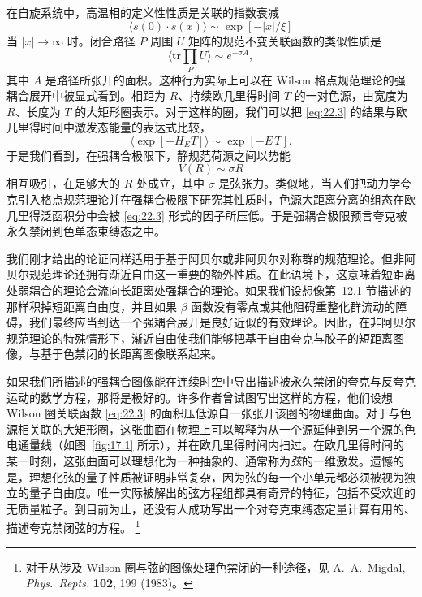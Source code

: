 在自旋系统中，高温相的定义性性质是关联的指数衰减
\begin{equation}
  \langle s(0)\cdot s(x)\rangle \sim \exp[-|x|/\xi]
  \label{eq:22.2}
\end{equation}
当 $|x|\to\infty$ 时。闭合路径 $P$ 周围 $U$ 矩阵的规范不变关联函数的类似性质是
\begin{equation}
  \bigl\langle \mathrm{tr}\prod_P U \bigr\rangle \sim e^{-\sigma A},
  \label{eq:22.3}
\end{equation}
其中 $A$ 是路径所张开的面积。这种行为实际上可以在 Wilson 格点规范理论的强耦合展开中被显式看到。相距为 $R$、持续欧几里得时间 $T$ 的一对色源，由宽度为 $R$、长度为 $T$ 的大矩形圈表示。对于这样的圈，我们可以把 \eqref{eq:22.3} 的结果与欧几里得时间中激发态能量的表达式比较，
\begin{equation}
  \langle \exp[-H_E T] \rangle \sim \exp[-E\,T] .
  \label{eq:22.4}
\end{equation}
于是我们看到，在强耦合极限下，静规范荷源之间以势能
\begin{equation}
  V(R) \sim \sigma R
  \label{eq:22.5}
\end{equation}
相互吸引，在足够大的 $R$ 处成立，其中 $\sigma$ 是弦张力。类似地，当人们把动力学夸克引入格点规范理论并在强耦合极限下研究其性质时，色源大距离分离的组态在欧几里得泛函积分中会被 \eqref{eq:22.3} 形式的因子所压低。于是强耦合极限预言夸克被永久禁闭到色单态束缚态之中。

我们刚才给出的论证同样适用于基于阿贝尔或非阿贝尔对称群的规范理论。但非阿贝尔规范理论还拥有渐近自由这一重要的额外性质。在此语境下，这意味着短距离处弱耦合的理论会流向长距离处强耦合的理论。如果我们设想像第~12.1 节描述的那样积掉短距离自由度，并且如果 $\beta$ 函数没有零点或其他阻碍重整化群流动的障碍，我们最终应当到达一个强耦合展开是良好近似的有效理论。因此，在非阿贝尔规范理论的特殊情形下，渐近自由使我们能够把基于自由夸克与胶子的短距离图像，与基于色禁闭的长距离图像联系起来。

如果我们所描述的强耦合图像能在连续时空中导出描述被永久禁闭的夸克与反夸克运动的数学方程，那将是极好的。许多作者曾试图写出这样的方程，他们设想 Wilson 圈关联函数 \eqref{eq:22.3} 的面积压低源自一张张开该圈的物理曲面。对于与色源相关联的大矩形圈，这张曲面在物理上可以解释为从一个源延伸到另一个源的色电通量线（如图~\ref{fig:17.1} 所示），并在欧几里得时间内扫过。在欧几里得时间的某一时刻，这张曲面可以理想化为一种抽象的、通常称为\emph{弦}的一维激发。遗憾的是，理想化弦的量子性质被证明非常复杂，因为弦的每一个小单元都必须被视为独立的量子自由度。唯一实际被解出的弦方程组都具有奇异的特征，包括不受欢迎的无质量粒子。到目前为止，还没有人成功写出一个对夸克束缚态定量计算有用的、描述夸克禁闭弦的方程。%
\footnote{对于从涉及 Wilson 圈与弦的图像处理色禁闭的一种途径，见 A.~A.~Migdal, \emph{Phys.\ Repts.} \textbf{102}, 199 (1983)。}

